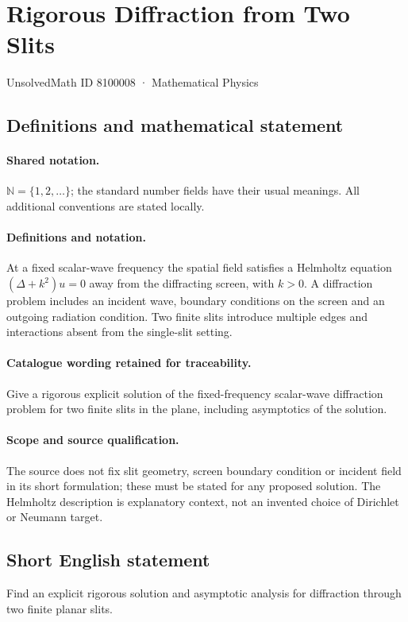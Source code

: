 \documentclass[11pt]{article}
\begin{document}
\setcounter{section}{8100007}
\section{Rigorous Diffraction from Two Slits}\label{8100008}
{\small UnsolvedMath ID 8100008 · Mathematical Physics}
\subsection{Definitions and mathematical statement}

\paragraph{Shared notation.}$\mathbb N=\{1,2,\ldots\}$; the standard number fields have their usual meanings. All additional conventions are stated locally.


\paragraph{Definitions and notation.}At a fixed scalar-wave frequency the spatial field satisfies a Helmholtz equation $(\Delta+k^2)u=0$ away from the diffracting screen, with $k>0$. A diffraction problem includes an incident wave, boundary conditions on the screen and an outgoing radiation condition. Two finite slits introduce multiple edges and interactions absent from the single-slit setting.

\paragraph{Catalogue wording retained for traceability.}
Give a rigorous explicit solution of the fixed-frequency scalar-wave diffraction problem for two finite slits in the plane, including asymptotics of the solution.
\paragraph{Scope and source qualification.}The source does not fix slit geometry, screen boundary condition or incident field in its short formulation; these must be stated for any proposed solution. The Helmholtz description is explanatory context, not an invented choice of Dirichlet or Neumann target.
\subsection{Short English statement}
Find an explicit rigorous solution and asymptotic analysis for diffraction through two finite planar slits.
\end{document}
